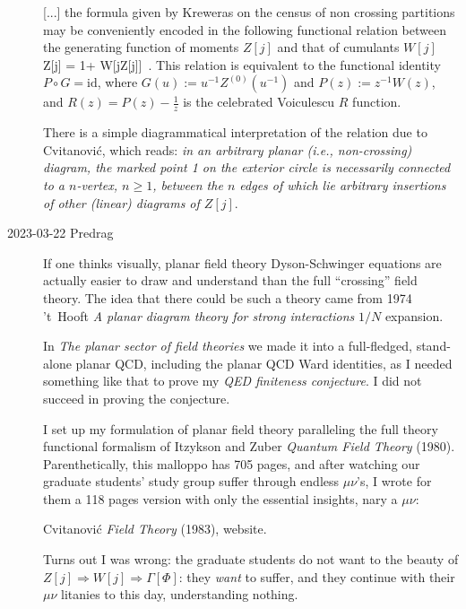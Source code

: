 \begin{description}
[...] the formula given by
Kreweras on the census of non crossing partitions may be
conveniently encoded in the following functional relation between the
generating function of moments $Z[j]$ and that of cumulants $W[j]$
\beq
 Z[j] = 1+ W[jZ[j]]
\,.
This relation is equivalent to the functional identity
$P\circ G=\mathrm{id}$, where $G(u):= u^{-1} Z^{(0)}(u^{-1})$ and
$P(z):= z^{-1} W(z)$, and $R(z)=P(z)-\frac{1}{z}$ is the celebrated
Voiculescu $R$ function.

There is a simple diagrammatical interpretation of the relation 
due to Cvitanovi\'c,
which reads: {\it in {an arbitrary} planar (i.e., non-crossing)
diagram, the marked point 1 on the exterior circle is necessarily
connected to a $n$-vertex, $n\ge 1$, between the $n$ edges of which lie
arbitrary insertions of other (linear) diagrams of $Z[j]$}.

   \item[2023-03-22 Predrag]
If one thinks visually, planar field theory Dyson-Schwinger equations
are actually easier to draw and understand than the full ``crossing''
field theory. The idea that there could be such a theory
came from 1974 't~Hooft
{\emph{A planar diagram theory for strong interactions}}
$1/N$ expansion.

In 
{{\em The planar sector of field theories}}
we made it into a full-fledged, stand-alone planar QCD,
including the planar QCD Ward identities,
as I needed something like that to prove my
{\em QED finiteness conjecture}. I did not succeed in proving the
conjecture.

I set up my formulation of planar field theory paralleling the
full theory functional formalism of
Itzykson and Zuber {\em Quantum Field Theory} (1980).
Parenthetically, this malloppo has  705 pages, and after watching our
graduate students' study group suffer through endless $\mu\nu$'s, I wrote
for them a 118 pages version with only the essential insights, nary a
$\mu\nu$:

Cvitanovi{\'c}  {\em Field Theory} (1983),
 {website}.

Turns out I was wrong: the graduate students do not want to the beauty of
$Z[j]\Rightarrow W[j] \Rightarrow \Gamma[\Phi]$: they \emph{want} to
suffer, and they continue with their $\mu\nu$ litanies to this day,
understanding nothing.


\end{description}
